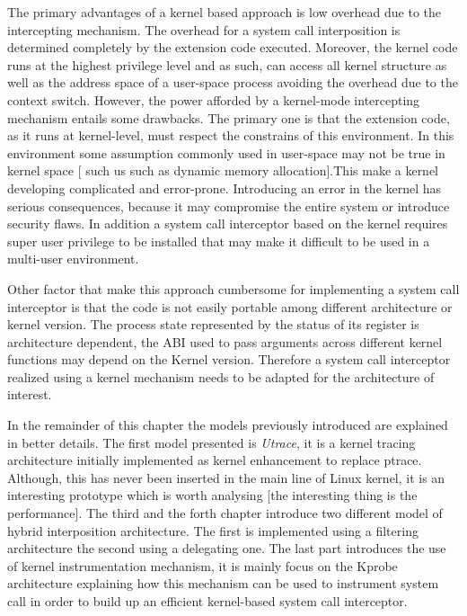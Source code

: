 The primary advantages of a kernel based approach is low overhead due to the intercepting mechanism. The overhead for a system call interposition is determined completely by the extension code executed. Moreover, the kernel code runs at the highest privilege level and as such, can access all kernel structure as well as the address space of a user-space process avoiding the overhead due to the context switch. However, the power afforded by a kernel-mode intercepting mechanism entails some drawbacks. The primary one is that the extension code, as it runs at kernel-level, must respect the constrains of this environment. In this environment some assumption commonly used in user-space may not be true in kernel space [ such us such as dynamic memory allocation].This make a kernel developing complicated and error-prone. Introducing an error in the kernel has serious consequences, because it may compromise the entire system or introduce security flaws. In addition a system call interceptor based on the kernel requires super user privilege to be installed that may make it difficult to be used in a multi-user environment.

Other factor that make this approach cumbersome for implementing a system call interceptor is that the code is not easily portable among different architecture or kernel version. The process state represented by the status of its register is architecture dependent, the ABI used to pass arguments across different kernel functions may depend on the Kernel version. Therefore a system call interceptor realized using a kernel mechanism needs to be adapted for the architecture of interest.

In the remainder of this chapter the models previously introduced are explained in better details. The first model presented is \textit{Utrace}, it is a kernel tracing architecture initially implemented as kernel enhancement to replace ptrace. Although, this has never been inserted in the main line of Linux kernel, it is an interesting prototype which is worth analysing [the interesting thing is the performance].  
The third and the forth chapter introduce two different model of hybrid interposition architecture. The first is implemented using a filtering architecture the second using a delegating one. The last part introduces the use of kernel instrumentation mechanism, it is mainly focus on the Kprobe architecture explaining how this mechanism can be used to instrument system call in order to build up an efficient kernel-based system call interceptor. 



